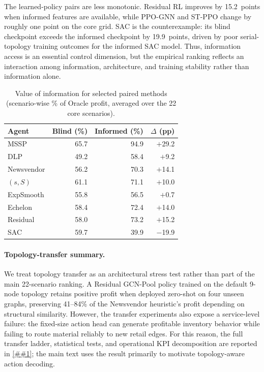 \documentclass[10pt,a4paper]{article}
\providecommand{\Cref}[1]{\ref{##1}}
\begin{document}
The learned-policy pairs are less monotonic. Residual RL improves by
15.2~points when informed features are available, while PPO-GNN and
ST-PPO change by roughly one point on the core grid. SAC is the
counterexample: its blind checkpoint exceeds the informed checkpoint by
19.9~points, driven by poor serial-topology training outcomes for the
informed SAC model. Thus, information access is an essential control
dimension, but the empirical ranking reflects an interaction among
information, architecture, and training stability rather than
information alone.

\begin{table}[!htbp]
\centering
\caption{Value of information for selected paired methods
  (scenario-wise \% of Oracle profit, averaged over the 22 core scenarios).}
\label{tab:info_value}
\small
\renewcommand{\arraystretch}{1.05}
\begin{tabular}{@{} l r r r @{}}
\toprule
\textbf{Agent}
  & \textbf{Blind (\%)}
  & \textbf{Informed (\%)}
  & \textbf{$\Delta$ (pp)} \\
\midrule
MSSP          & 65.7 & 94.9 & $+$29.2 \\
DLP           & 49.2 & 58.4 & $+$9.2 \\
Newsvendor    & 56.2 & 70.3 & $+$14.1 \\
$(s,S)$       & 61.1 & 71.1 & $+$10.0 \\
ExpSmooth     & 55.8 & 56.5 & $+$0.7 \\
Echelon       & 58.4 & 72.4 & $+$14.0 \\
Residual      & 58.0 & 73.2 & $+$15.2 \\
SAC           & 59.7 & 39.9 & $-$19.9 \\
\bottomrule
\end{tabular}
\end{table}

\paragraph{Topology-transfer summary.}
We treat topology transfer as an architectural stress test rather than
part of the main 22-scenario ranking. A Residual GCN-Pool policy trained
on the default 9-node topology retains positive profit when deployed
zero-shot on four unseen graphs, preserving 41--84\% of the Newsvendor
heuristic's profit depending on structural similarity. However, the
transfer experiments also expose a service-level failure: the
fixed-size action head can generate profitable inventory behavior while
failing to route material reliably to new retail edges. For this reason,
the full transfer ladder, statistical tests, and operational KPI
decomposition are reported in \Cref{sec:appendix_transfer}; the main
text uses the result primarily to motivate topology-aware action
decoding.
\end{document}
